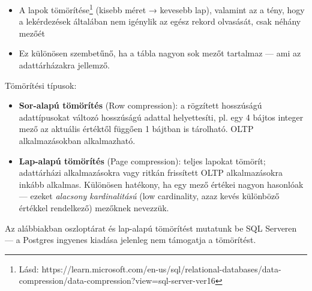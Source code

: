 \documentclass[
  magyar,
]{article}
\providecommand{\tightlist}{%
  \setlength{\itemsep}{0pt}\setlength{\parskip}{0pt}}
\begin{document}
\begin{itemize}
\tightlist
\item
  A lapok tömörítése\footnote{Lásd:
    https://learn.microsoft.com/en-us/sql/relational-databases/data-compression/data-compression?view=sql-server-ver16}
  (kisebb méret → kevesebb lap), valamint az a tény, hogy a lekérdezések
  általában nem igénylik az egész rekord olvasását, csak néhány mezőét
\item
  Ez különösen szembetűnő, ha a tábla nagyon sok mezőt tartalmaz --- ami
  az adattárházakra jellemző.
\end{itemize}

Tömörítési típusok:

\begin{itemize}
\tightlist
\item
  \textbf{Sor-alapú tömörítés} (Row compression): a rögzített hosszúságú
  adattípusokat változó hosszúságú adattal helyettesíti, pl. egy 4
  bájtos integer mező az aktuális értéktől függően 1 bájtban is
  tárolható. OLTP alkalmazásokban alkalmazható.
\item
  \textbf{Lap-alapú tömörítés} (Page compression): teljes lapokat
  tömörít; adattárházi alkalmazásokra vagy ritkán frissített OLTP
  alkalmazásokra inkább alkalmas. Különösen hatékony, ha egy mező
  értékei nagyon hasonlóak --- ezeket \emph{alacsony kardinalitású} (low
  cardinality, azaz kevés különböző értékkel rendelkező) mezőknek
  nevezzük.
\end{itemize}

Az alábbiakban oszloptárat és lap-alapú tömörítést mutatunk be SQL
Serveren --- a Postgres ingyenes kiadása jelenleg nem támogatja a
tömörítést.
\end{document}
